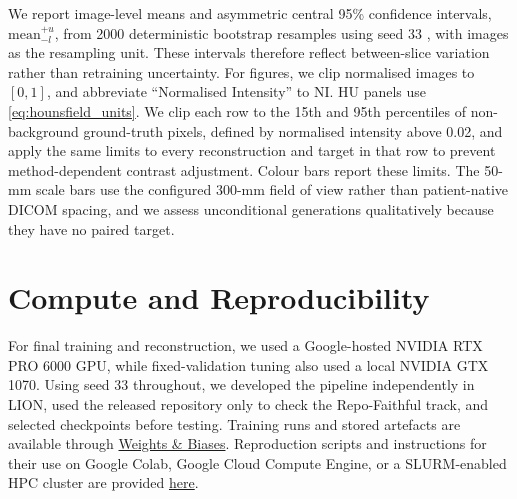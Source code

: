 We report image-level means and asymmetric central 95\% confidence intervals, $\mathrm{mean}^{+u}_{-l}$, from 2000 deterministic bootstrap resamples using seed 33 \cite{efron_automatic_2020}, with images as the resampling unit. These intervals therefore reflect between-slice variation rather than retraining uncertainty. For figures, we clip normalised images to $[0,1]$, and abbreviate ``Normalised Intensity'' to NI. HU panels use \autoref{eq:hounsfield_units}. We clip each row to the 15th and 95th percentiles of non-background ground-truth pixels, defined by normalised intensity above 0.02, and apply the same limits to every reconstruction and target in that row to prevent method-dependent contrast adjustment. Colour bars report these limits. The 50-mm scale bars use the configured 300-mm field of view rather than patient-native DICOM spacing, and we assess unconditional generations qualitatively because they have no paired target.
\section{Compute and Reproducibility}
For final training and reconstruction, we used a Google-hosted NVIDIA RTX PRO 6000 GPU, while fixed-validation tuning also used a local NVIDIA GTX 1070. Using seed 33 throughout, we developed the pipeline independently in LION, used the released repository only to check the Repo-Faithful track, and selected checkpoints before testing. Training runs and stored artefacts are available through \href{https://wandb.ai/tjh200-university-of-cambridge/PaDIS-Reproduction?nw=nwusertjh200}{Weights \& Biases}. Reproduction scripts and instructions for their use on Google Colab, Google Cloud Compute Engine, or a SLURM-enabled HPC cluster are provided \href{https://github.com/THartigan/MPhil-Project/tree/main/LION/scripts/paper_scripts/PaDIS-Reproduction}{here}.

